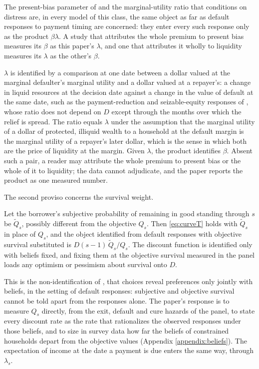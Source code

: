 \noindent The present-bias parameter of \citet{laibson_golden_1997} and the marginal-utility ratio that \citet{indarte_moral_2023} conditions on distress are, in every model of this class, the same object as far as default responses to payment timing are concerned: they enter every such response only as the product $\beta\lambda$. A study that attributes the whole premium to present bias measures its $\beta$ as this paper's $\lambda$, and one that attributes it wholly to liquidity measures its $\lambda$ as the other's $\beta$.

\begin{corollary}\label{cor:separate}
$\lambda$ is identified by a comparison at one date between a dollar valued at the marginal defaulter's marginal utility and a dollar valued at a repayer's: a change in liquid resources at the decision date against a change in the value of default at the same date, such as the payment-reduction and seizable-equity responses of \citet{indarte_moral_2023}, whose ratio does not depend on $D$ except through the months over which the relief is spread. The ratio equals $\lambda$ under the assumption that the marginal utility of a dollar of protected, illiquid wealth to a household at the default margin is the marginal utility of a repayer's later dollar, which is the sense in which both are the price of liquidity at the margin. Given $\lambda$, the product identifies $\beta$. Absent such a pair, a reader may attribute the whole premium to present bias or the whole of it to liquidity; the data cannot adjudicate, and the paper reports the product as one measured number.
\end{corollary}

The second proviso concerns the survival weight.

\begin{proposition}\label{prop:beliefs}
Let the borrower's subjective probability of remaining in good standing through $s$ be $\tilde Q_s$, possibly different from the objective $Q_s$. Then \eqref{eq:curveT} holds with $\tilde Q_s$ in place of $Q_s$, and the object identified from default responses with objective survival substituted is $D(s-1)\,\tilde Q_s/Q_s$. The discount function is identified only with beliefs fixed, and fixing them at the objective survival measured in the panel loads any optimism or pessimism about survival onto $D$.
\end{proposition}

\noindent This is the non-identification of \citet{manski_measuring_2004}, that choices reveal preferences only jointly with beliefs, in the setting of default responses: subjective and objective survival cannot be told apart from the responses alone. The paper's response is to measure $Q_s$ directly, from the exit, default and cure hazards of the panel, to state every discount rate as the rate that rationalizes the observed responses under those beliefs, and to size in survey data how far the beliefs of constrained households depart from the objective values (Appendix \ref{appendix:beliefs}). The expectation of income at the date a payment is due enters the same way, through $\lambda_s$.

